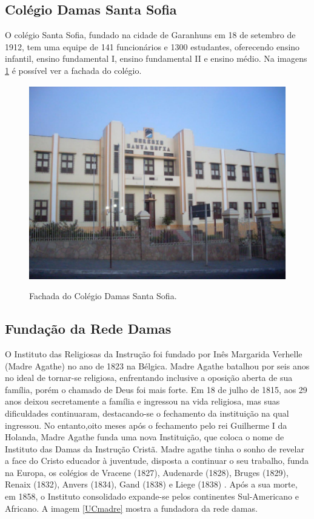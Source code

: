 \documentclass[eso]{bcc}
\begin{document}
\subsection{Colégio Damas Santa Sofia}

O colégio Santa Sofia, fundado na cidade de Garanhuns  em 18 de setembro de 1912, tem uma equipe de 141 funcionários e 1300 estudantes, oferecendo ensino infantil, ensino fundamental I, ensino fundamental II e ensino médio. 
Na imagens \ref{UCfachada} é possível ver a fachada do colégio.

\newpage

\begin{figure}[!h]
\centering
\caption[Fachada Colégio]{Fachada do Colégio Damas Santa Sofia.}
\includegraphics[scale=1.3]{Figuras/fachadacolegio.png}
\label{UCfachada}
\end{figure}
\subsection{Fundação da Rede Damas}
O  Instituto das Religiosas da Instrução foi fundado por Inês Margarida Verhelle (Madre Agathe) no ano de 1823 na Bélgica.  Madre Agathe batalhou  por seis anos no ideal de tornar-se religiosa, enfrentando inclusive a oposição aberta de sua família, porém o chamado de Deus foi mais forte. Em 18 de julho de 1815, aos 29 anos deixou secretamente a família e ingressou na vida religiosa, mas suas dificuldades continuaram, destacando-se o fechamento da instituição na qual ingressou. No entanto,oito meses após o fechamento pelo rei Guilherme I da Holanda, Madre Agathe funda uma nova Instituição, que coloca o nome de  Instituto das Damas da Instrução Cristã.
Madre agathe tinha o sonho de revelar a face do Cristo educador à juventude, disposta a continuar o seu trabalho, funda na Europa, os colégios de Vracene (1827), Audenarde (1828), Bruges (1829), Renaix (1832), Anvers (1834), Gand (1838) e Liege (1838) . Após a sua morte, em 1858, o Instituto consolidado expande-se pelos continentes Sul-Americano e Africano. A imagem \ref{UCmadre} mostra a fundadora da rede damas.
\end{document}
